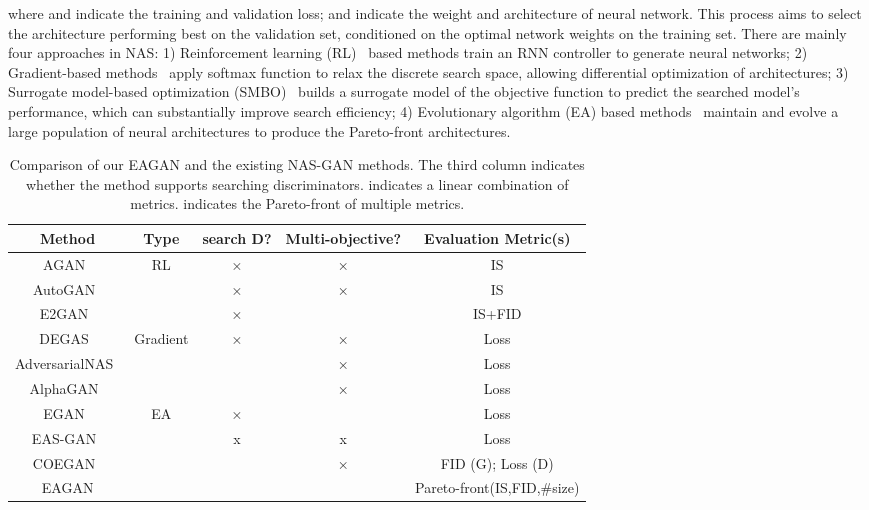 \documentclass[runningheads]{llncs}
\begin{document}
\noindent where  and  indicate the training and validation loss;  and  indicate the weight and architecture of neural network. This process aims to select the architecture  performing best on the validation set, conditioned on the optimal network weights  on the training set. There are mainly four approaches in NAS: 1) Reinforcement learning (RL)~\cite{nas2016,enas} based methods train an RNN controller to generate neural networks; 2) Gradient-based methods~\cite{darts} apply softmax function to relax the discrete search space, allowing differential optimization of architectures; 3) Surrogate model-based optimization (SMBO)~\cite{pnas_liu18} builds a surrogate model of the objective function to predict the searched model's performance, which can substantially improve search efficiency; 4) Evolutionary algorithm (EA) based methods~\cite{amoebanet,cars} maintain and evolve a large population of neural architectures to produce the Pareto-front architectures.



\begin{table*}[!ht]
    \centering
    \scalebox{1}
    {
    \begin{tabular}{c|c|c|c|c}\hline
    Method & Type & search D? &Multi-objective? & Evaluation Metric(s)\\\hline
    
    AGAN~\cite{agan} & \multirow{3}{*}{RL} & × &×&IS\\
    AutoGAN~\cite{autoGAN} & & × & ×&IS\\
    E2GAN~\cite{offgan} & & × & & IS+FID\\\hline
    
    DEGAS~\cite{DEGAS} &  \multirow{3}{*}{Gradient} &×& ×&Loss\\
    AdversarialNAS~\cite{Adversarialnas} &&  & ×&Loss\\
    AlphaGAN~\cite{AlphaGAN} & & & ×&Loss\\ \hline
    
    EGAN~\cite{EGAN} & \multirow{4}{*}{EA}& ×&  & Loss \\
    EAS-GAN~\cite{EAS-GAN} & & x & x& Loss \\
    COEGAN~\cite{costa2019coevolution}& &&×&FID (G); Loss (D)\\
    EAGAN & &  &  &Pareto-front(IS,FID,\#size)\\\hline
    \end{tabular}
    }
    \caption{Comparison of our EAGAN and the existing NAS-GAN methods. The third column indicates whether the method supports searching discriminators.  indicates a linear combination of metrics.  indicates the Pareto-front of multiple metrics.}
    \label{tab:NAS_GAN}
\end{table*}
\end{document}
